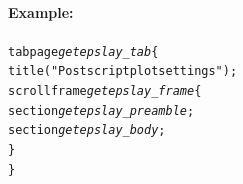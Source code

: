 

\paragraph{Example:}
\begin{alltt}
tabpage \emph{getepslay_tab} \{
    title("Postscript plot settings");
    scrollframe \emph{getepslay_frame} \{
        section \emph{getepslay_preamble};
        section \emph{getepslay_body};
    \}
\}
\end{alltt}

